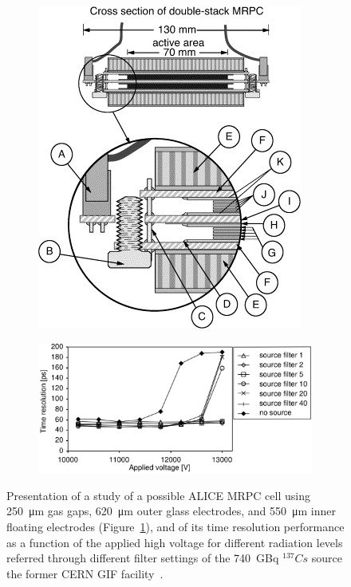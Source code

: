 	\begin{figure}[H]
		\begin{subfigure}{0.4\linewidth}
			\centering
			\includegraphics[width = 0.45\plotwidth]{fig/chapt4/MRPC-Layout.png}
			\caption{\label{fig:ALICEMRPC:A}}
		\end{subfigure}
		\begin{subfigure}{0.6\linewidth}
			\centering
			\includegraphics[width = 0.7\plotwidth]{fig/chapt4/ALICE-2002-time-res.png}
			\caption{\label{fig:ALICEMRPC:B}}
		\end{subfigure}
		\caption{\label{fig:ALICEMRPC} Presentation of a study of a possible ALICE MRPC cell using \SI{250}{\micro m} gas gaps, \SI{620}{\micro m} outer glass electrodes, and \SI{550}{\micro m} inner floating electrodes (Figure~\ref{fig:ALICEMRPC:A}), and of its time resolution performance as a function of the applied high voltage for different radiation levels referred through different filter settings of the \SI{740}{GBq} $^{137}Cs$ source the former CERN GIF facility~\cite{ALICE2002}.}
	\end{figure}
	
